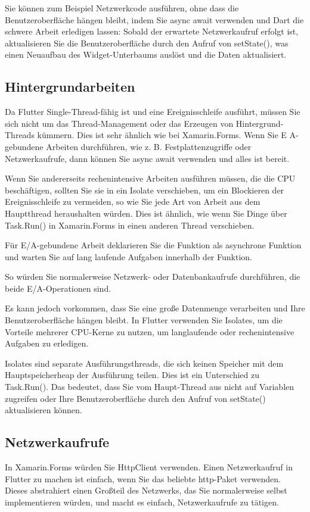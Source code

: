 Sie können zum Beispiel Netzwerkcode ausführen, ohne dass die Benutzeroberfläche hängen bleibt, indem Sie async await verwenden und Dart die schwere Arbeit erledigen lassen:
Sobald der erwartete Netzwerkaufruf erfolgt ist, aktualisieren Sie die Benutzeroberfläche durch den Aufruf von setState(), was einen Neuaufbau des Widget-Unterbaums auslöst und die Daten aktualisiert.
\subsection{Hintergrundarbeiten}
Da Flutter Single-Thread-fähig ist und eine Ereignisschleife ausführt, müssen Sie sich nicht um das Thread-Management oder das Erzeugen von Hintergrund-Threads kümmern. Dies ist sehr ähnlich wie bei Xamarin.Forms. Wenn Sie E A-gebundene Arbeiten durchführen, wie z. B. Festplattenzugriffe oder Netzwerkaufrufe, dann können Sie async await verwenden und alles ist bereit.

Wenn Sie andererseits rechenintensive Arbeiten ausführen müssen, die die CPU beschäftigen, sollten Sie sie in ein Isolate verschieben, um ein Blockieren der Ereignisschleife zu vermeiden, so wie Sie jede Art von Arbeit aus dem Hauptthread heraushalten würden. Dies ist ähnlich, wie wenn Sie Dinge über Task.Run() in Xamarin.Forms in einen anderen Thread verschieben.

Für E/A-gebundene Arbeit deklarieren Sie die Funktion als asynchrone Funktion und warten Sie auf lang laufende Aufgaben innerhalb der Funktion.

So würden Sie normalerweise Netzwerk- oder Datenbankaufrufe durchführen, die beide E/A-Operationen sind.

Es kann jedoch vorkommen, dass Sie eine große Datenmenge verarbeiten und Ihre Benutzeroberfläche hängen bleibt. In Flutter verwenden Sie Isolates, um die Vorteile mehrerer CPU-Kerne zu nutzen, um langlaufende oder rechenintensive Aufgaben zu erledigen.

Isolates sind separate Ausführungsthreads, die sich keinen Speicher mit dem Hauptspeicherheap der Ausführung teilen. Dies ist ein Unterschied zu Task.Run(). Das bedeutet, dass Sie vom Haupt-Thread aus nicht auf Variablen zugreifen oder Ihre Benutzeroberfläche durch den Aufruf von setState() aktualisieren können.
\subsection{Netzwerkaufrufe}
In Xamarin.Forms würden Sie HttpClient verwenden. Einen Netzwerkaufruf in Flutter zu machen ist einfach, wenn Sie das beliebte http-Paket verwenden. Dieses abstrahiert einen Großteil des Netzwerks, das Sie normalerweise selbst implementieren würden, und macht es einfach, Netzwerkaufrufe zu tätigen.

